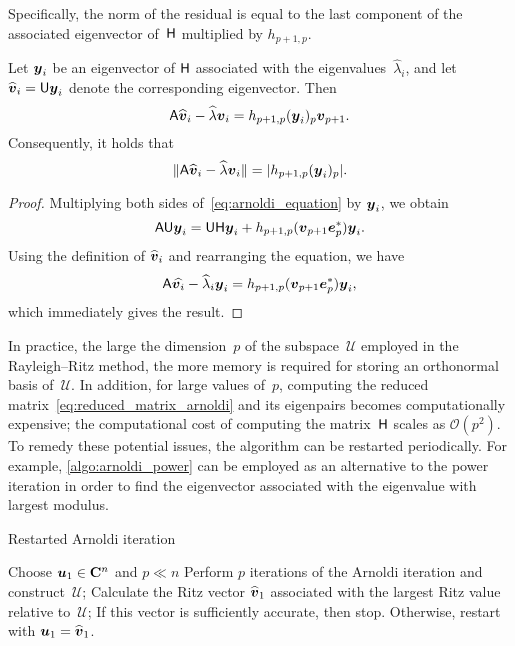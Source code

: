 Specifically, the norm of the residual is equal to the last component of the associated eigenvector of~$\mathsf H$ multiplied by $h_{p+1,p}$.
\begin{proposition}
    Let $\mathbf{\boldsymbol{y}}_i$ be an eigenvector of $\mathsf H$ associated with the eigenvalues~$\widehat \lambda_i$,
    and let $\widehat {\mathbf{\boldsymbol{v}}}_i = \mathsf U \mathbf{\boldsymbol{y}}_i$ denote the corresponding eigenvector.
    Then
    \[
        \mathsf A \widehat {\mathbf{\boldsymbol{v}}}_i - \widehat \lambda \mathbf{\boldsymbol{v}}_i = h_{p+1,p} (\mathbf{\boldsymbol{y}}_i)_p \mathbf{\boldsymbol{v}}_{p+1}.
    \]
    Consequently, it holds that
    \[
        \lVert\mathsf A \widehat {\mathbf{\boldsymbol{v}}}_i - \widehat \lambda \mathbf{\boldsymbol{v}}_i\rVert = \lvert h_{p+1,p} (\mathbf{\boldsymbol{y}}_i)_p\rvert.
    \]
\end{proposition}
\begin{proof}
    Multiplying both sides of~\eqref{eq:arnoldi_equation} by $\mathbf{\boldsymbol{y}}_i$,
    we obtain
    \[
        \mathsf A \mathsf U \mathbf{\boldsymbol{y}}_i = \mathsf U \mathsf H \mathbf{\boldsymbol{y}}_i + h_{p+1,p} (\mathbf{\boldsymbol{v}}_{p+1} \mathbf{\boldsymbol{e}}_p^*) \mathbf{\boldsymbol{y}}_i.
    \]
    Using the definition of $\widehat {\mathbf{\boldsymbol{v}}}_i$ and rearranging the equation,
    we have
    \[
        \mathsf A \widehat {\mathbf{\boldsymbol{v}}_i} - \widehat \lambda_i \mathbf{\boldsymbol{y}}_i  = h_{p+1,p} (\mathbf{\boldsymbol{v}}_{p+1} \mathbf{\boldsymbol{e}}_p^*) \mathbf{\boldsymbol{y}}_i,
    \]
    which immediately gives the result.
\end{proof}

In practice, the large the dimension~$p$ of the subspace~$\mathcal U$ employed in the Rayleigh--Ritz method,
the more memory is required for storing an orthonormal basis of~$\mathcal U$.
In addition, for large values of~$p$,
computing the reduced matrix~\eqref{eq:reduced_matrix_arnoldi} and its eigenpairs becomes computationally expensive;
the computational cost of computing the matrix~$\mathsf H$ scales as $\mathcal O(p^2)$.
To remedy these potential issues,
the algorithm can be restarted periodically.
For example, \cref{algo:arnoldi_power} can be employed as an alternative to the power iteration
in order to find the eigenvector associated with the eigenvalue with largest modulus.

\begin{algorithm}
\caption{Restarted Arnoldi iteration}%
\label{algo:arnoldi_power}%
\begin{algorithmic}
\State Choose $\mathbf{\boldsymbol{u}}_1 \in \mathbf C^n$ and $p \ll n$
    \State Perform $p$ iterations of the Arnoldi iteration and construct~$\mathcal U$;
    \State Calculate the Ritz vector $\widehat {\mathbf{\boldsymbol{v}}}_1$ associated with the largest Ritz value relative to~$\mathcal U$;
    \State If this vector is sufficiently accurate, then stop. Otherwise, restart with $\mathbf{\boldsymbol{u}}_1 = \widehat {\mathbf{\boldsymbol{v}}}_1$.
\EndFor
\end{algorithmic}
\end{algorithm}

